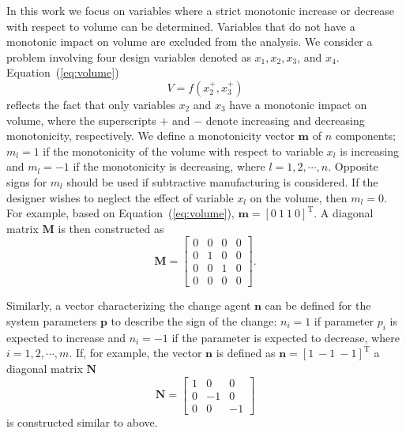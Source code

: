 In this work we focus on variables where a strict monotonic increase or decrease with respect to volume can be determined. Variables that do not have a monotonic impact on volume are excluded from the analysis. We consider a problem involving four design variables denoted as $x_1,x_2,x_3$, and $x_4$. Equation~(\ref{eq:volume})
\begin{equation}
	V = f(x_2^+,x_3^+) \label{eq:volume}
\end{equation}
reflects the fact that only variables $x_2$ and $x_3$ have a monotonic impact on volume,
where the superscripts $+$ and $-$ denote increasing and decreasing monotonicity, respectively. 
%
We define a monotonicity vector $\mathbf{m}$ of $n$ components; $m_l = 1$ if the monotonicity of the volume with respect to variable $x_l$ is increasing and $m_l= -1$ if the monotonicity is decreasing, where $l = 1,2,\cdots,n$. Opposite signs for $m_l$ should be used if subtractive manufacturing is considered. If the designer wishes to neglect the effect of variable $x_l$ on the volume, then  $m_l = 0$. For example, based on Equation~(\ref{eq:volume}), $\mathbf{m} = \left[0~1~1~0\right]^{\text{T}}$. A diagonal matrix $\mathbf{M}$ is then constructed as
%
\begin{equation}
	\mathbf{M} = 
\begin{bmatrix}
	 	0 &  0 & 0 & 0\\ 
	 	0 & 1 & 0 & 0\\ 
	 	0 &  0 & 1 & 0 \\ 
	 	0 &  0 & 0 & 0
	\end{bmatrix}.
	\label{eq:monotonicity}
\end{equation}

Similarly, a vector characterizing the {change agent} $\mathbf{n}$ can be defined for the system parameters $\mathbf{p}$ to describe the sign of the change: $n_i = 1$ if parameter $p_i$ is expected to increase and $n_i = -1$ if the parameter is expected to decrease, where $i = 1,2,\cdots,m$. If, for example, the vector $\mathbf{n}$ is defined as $\mathbf{n} = \left[1~-1~-1\right]^{\text{T}}$ a diagonal matrix $\mathbf{N}$ 
\begin{equation}
	\mathbf{N} =
	\begin{bmatrix}
	 	1 &  0 & 0\\ 
	 	0 & -1 & 0\\ 
	 	0 &  0 & -1
	\end{bmatrix} \label{eq:changeeffect}
\end{equation}
is constructed similar to above.

